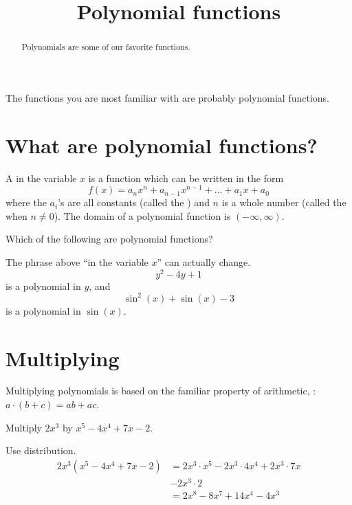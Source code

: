\documentclass{ximera}
\title[Dig-In:]{Polynomial functions}
\begin{document}
\begin{abstract}
  Polynomials are some of our favorite functions. 
\end{abstract}
\maketitle


The functions you are most familiar with are probably polynomial
functions.

\section{What are polynomial functions?}

\begin{definition}
  A  in the variable $x$ is a function
  which can be written in the form
  \[
  f(x) = a_nx^n + a_{n-1}x^{n-1} + \dots + a_1 x + a_0
  \]
  where the $a_i$'s are all constants (called the )
  and $n$ is a whole number (called the  when $n\ne
  0$). The domain of a polynomial function is $(-\infty,\infty)$.
\end{definition}

\begin{question}
  Which of the following are polynomial functions?
  \begin{selectAll}
  \end{selectAll}
\end{question}

The phrase above ``in the variable $x$'' can actually change.
\[
y^2-4y +1
\]
is a polynomial in $y$, and
\[
\sin^2(x) + \sin(x) -3 
\]
is a polynomial in $\sin(x)$.


\section{Multiplying}

Multiplying polynomials is based on the familiar property of arithmetic, : $\displaystyle a\cdot( b + c ) = ab + ac$.
\begin{example}
	Multiply $2x^3$ by $x^5 - 4x^4 + 7x - 2$.
	\begin{explanation}
		Use distribution.
		\begin{align*}
			2x^3 \left( x^5 - 4x^4 + 7x - 2 \right) &= 2x^3 \cdot x^5 - 2x^3 \cdot 4x^4 + 2x^3 \cdot 7x \\
				& - 2x^3 \cdot 2\\
				&= 2 x^8 - 8x^7 + 14x^4 - 4x^3
		\end{align*}
	\end{explanation}
\end{example}
\end{document}
